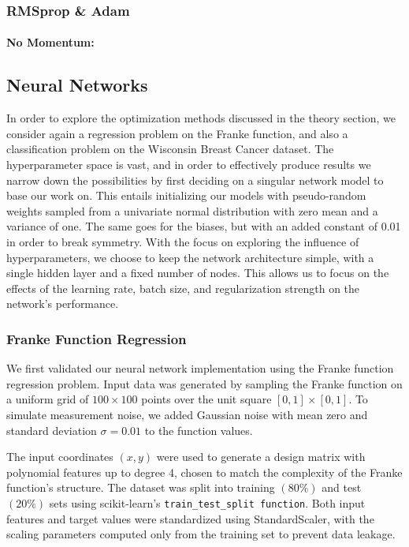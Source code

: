 \subsubsection{RMSprop \& Adam}
\paragraph{No Momentum:}

\subsection{Neural Networks}
In order to explore the optimization methods discussed in the theory section, we consider again a regression problem on the Franke function, and also a classification problem on the Wisconsin Breast Cancer dataset. %
The hyperparameter space is vast, and in order to effectively produce results we narrow down the possibilities by first deciding on a singular network model to base our work on. This entails initializing our models with pseudo-random weights sampled from a univariate normal distribution with zero mean and a variance of one. The same goes for the biases, but with an added constant of 0.01 in order to break symmetry. With the focus on exploring the influence of hyperparameters, we choose to keep the network architecture simple, with a single hidden layer and a fixed number of nodes. This allows us to focus on the effects of the learning rate, batch size, and regularization strength on the network's performance.
\subsubsection{Franke Function Regression}

We first validated our neural network implementation using the Franke function regression problem. Input data was generated by sampling the Franke function on a uniform grid of \( 100 \times 100 \) points over the unit square \( [0,1]\times[0,1] \). To simulate measurement noise, we added Gaussian noise with mean zero and standard deviation \( \sigma = 0.01 \) to the function values.

The input coordinates \( (x,y) \) were used to generate a design matrix with polynomial features up to degree 4, chosen to match the complexity of the Franke function's structure. The dataset was split into training \( (80\%) \) and test \( (20\%) \) sets using scikit-learn's \verb|train_test_split function|. Both input features and target values were standardized using StandardScaler, with the scaling parameters computed only from the training set to prevent data leakage.

